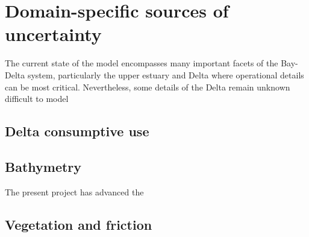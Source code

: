 \section{Domain-specific sources of uncertainty}
The current state of the model encompasses many important facets of the Bay-Delta system, particularly the upper estuary and Delta where operational details can be most critical. Nevertheless, some details of the Delta remain unknown difficult to model
  \subsection{Delta consumptive use}

	
	\subsection{Bathymetry}
  The present project has advanced the 

	\subsection{Vegetation and friction}
	


